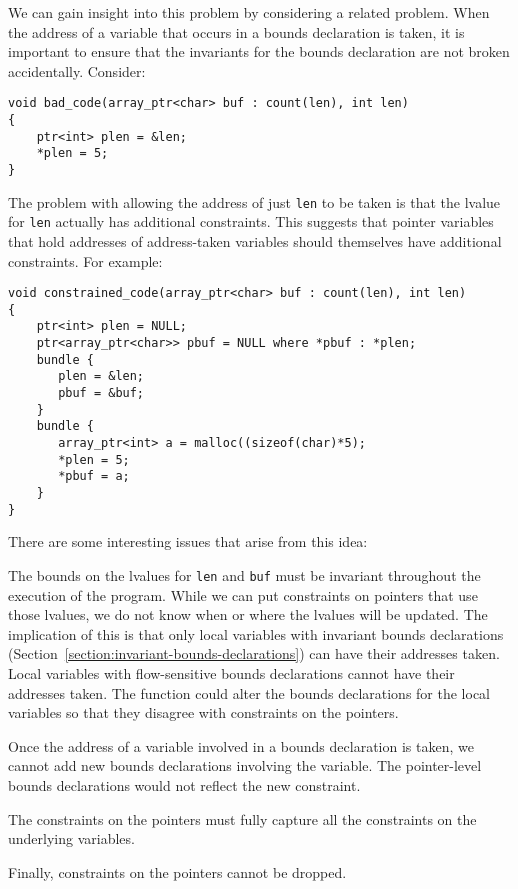 We can gain insight into this problem by considering a related
problem.   When the address of a variable that occurs in a bounds declaration is 
taken, it is important to ensure that the invariants for the bounds declaration are not
broken accidentally.  Consider:
\begin{verbatim}
void bad_code(array_ptr<char> buf : count(len), int len) 
{
    ptr<int> plen = &len;
    *plen = 5;
}
\end{verbatim}
The problem with allowing the address of just \texttt{len} to be taken is
that the lvalue for \texttt{len} actually has additional constraints. This
suggests that pointer variables that hold addresses of address-taken variables should
themselves have additional constraints.  For example:
\begin{verbatim}
void constrained_code(array_ptr<char> buf : count(len), int len) 
{
    ptr<int> plen = NULL;
    ptr<array_ptr<char>> pbuf = NULL where *pbuf : *plen;
    bundle {
       plen = &len;
       pbuf = &buf;
    }
    bundle {
       array_ptr<int> a = malloc((sizeof(char)*5);
       *plen = 5;
       *pbuf = a;
    }
}
\end{verbatim}
There are some interesting issues that arise from this idea:
\begin{compactitem}
\item The bounds on the lvalues for \texttt{len} and
\texttt{buf} must be invariant throughout the execution of the program.
While we can put constraints on pointers that use those lvalues,
we do not know when or where the lvalues will be updated.
The implication of this is that only local variables with invariant
bounds declarations (Section~\ref{section:invariant-bounds-declarations})
can have their addresses taken.   Local variables
with flow-sensitive bounds declarations cannot have their addresses taken.
The function could alter the bounds declarations for the local variables
so that they disagree with constraints on the pointers.
\item Once the address of a variable involved in a bounds declaration 
is taken, we cannot add new bounds declarations involving the variable.
The pointer-level bounds declarations would not reflect the new constraint.
\item The constraints on the pointers must fully capture 
all the constraints on the underlying variables.
\item Finally, constraints on the pointers cannot be dropped.
\end{compactitem}


